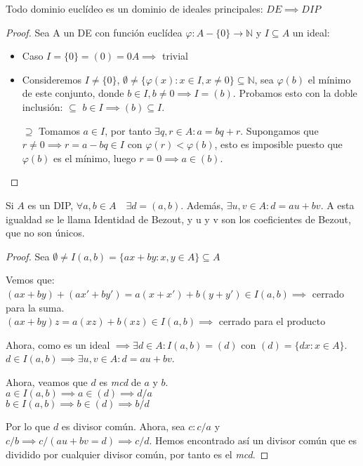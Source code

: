\begin{nth}
	Todo dominio euclídeo es un dominio de ideales principales: $DE \implies DIP$
\end{nth}
\begin{proof}
	Sea A un DE con función euclídea $\varphi: A-\{ 0 \} \longrightarrow \mathbb{N}$ y $I\subseteq A$ un ideal:
	\begin{itemize}
		\item Caso $I=\{ 0 \} = (0)= 0A \implies $ trivial
		\item Consideremos $I\neq \{ 0\}$, $\emptyset \neq \{ \varphi (x): x\in I, x\neq 0\} \subseteq \mathbb{N}$, sea $\varphi (b)$ el mínimo de este conjunto, donde $b\in I, b\neq 0 \implies I=(b)$. Probamos esto con la doble inclusión:
		  $\boxed{\subseteq}$ $b\in I \implies (b)\subseteq I$.

		$\boxed{\supseteq}$ Tomamos $a\in I$, por tanto $\exists q,r\in A: a=bq+r$. Supongamos que $r\neq 0 \implies r=a-bq\in I$ con $\varphi (r) < \varphi (b)$, esto es imposible puesto que $\varphi(b)$ es el mínimo, luego $r=0 \implies a\in (b)$.
	\end{itemize}
\end{proof}


\begin{nth}
	Si $A$ es un DIP, $\forall a,b \in A \quad \exists d = (a,b)$. Además, $\exists u,v \in A : d = au+bv$. A esta igualdad se le llama Identidad de Bezout, y u y v son los coeficientes de Bezout, que no son únicos.

\end{nth}

\begin{proof}
	Sea $\emptyset \ne I(a,b) = \{ax + by : x,y \in A\} \subseteq A$

	Vemos que:\\
$(ax+by)+(ax'+by') = a(x+x') + b(y+y') \in I(a,b) \implies$ cerrado para la suma.\\
$(ax+by)z = a(xz)+b(xz) \in I(a,b) \implies$ cerrado para el producto

Ahora, como es un ideal $\implies \exists d\in A : I(a,b) = (d)$ con $(d)=\{dx: x \in A\}$.
$d\in I(a,b) \implies \exists u,v \in A : d=au+bv$.

Ahora, veamos que $d$ es \textit{mcd} de $a$ y $b$.\\
$a\in I(a,b) \implies a \in (d) \implies d/a$\\
$b\in I(a,b) \implies b \in (d) \implies b/d$

Por lo que $d$ es divisor común. Ahora, sea $c: c/a$ y $c/b \implies c/(au+bv=d) \implies c/d$.
Hemos encontrado así un divisor común que es dividido por cualquier divisor común, por tanto es el \textit{mcd}.
\end{proof}


